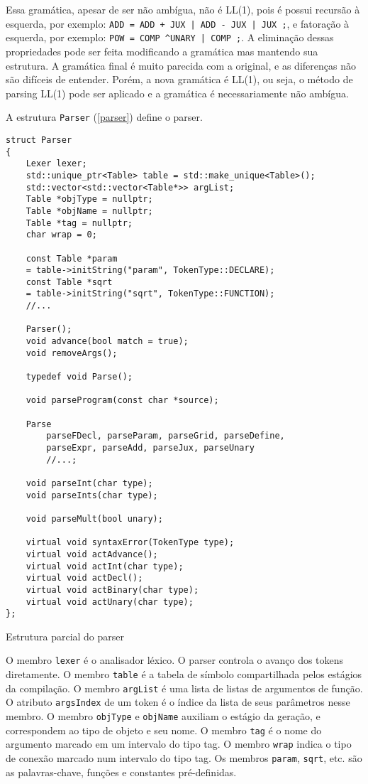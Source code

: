 \documentclass[10pt,a4paper]{article}
\newenvironment{code}{\captionsetup{type=listing}}{}
\begin{document}
Essa gramática, apesar de ser não ambígua, não é LL(1), pois é possui recursão à esquerda,
por exemplo: \texttt{ADD = ADD + JUX | ADD - JUX | JUX ;}, e fatoração à esquerda,
por exemplo: \texttt{POW = COMP \textasciicircum UNARY | COMP ;}.
A eliminação dessas propriedades pode ser feita modificando a gramática mas mantendo sua estrutura.
A gramática final é muito parecida com a original, e as diferenças não são difíceis de entender.
Porém, a nova gramática é LL(1), ou seja, o método de parsing LL(1) pode ser aplicado e
a gramática é necessariamente não ambígua.

A estrutura \texttt{Parser} (\ref{parser}) define o parser.

\begin{code}
\begin{verbatim}
struct Parser
{
    Lexer lexer;
    std::unique_ptr<Table> table = std::make_unique<Table>();
    std::vector<std::vector<Table*>> argList;
    Table *objType = nullptr;
    Table *objName = nullptr;
    Table *tag = nullptr;
    char wrap = 0;
	
    const Table *param
    = table->initString("param", TokenType::DECLARE);
    const Table *sqrt
    = table->initString("sqrt", TokenType::FUNCTION);
    //...

    Parser();
    void advance(bool match = true);
    void removeArgs();

    typedef void Parse();

    void parseProgram(const char *source);

    Parse 
        parseFDecl, parseParam, parseGrid, parseDefine, 
        parseExpr, parseAdd, parseJux, parseUnary
        //...;

    void parseInt(char type);
    void parseInts(char type);

    void parseMult(bool unary);

    virtual void syntaxError(TokenType type);
    virtual void actAdvance();
    virtual void actInt(char type);
    virtual void actDecl();
    virtual void actBinary(char type);
    virtual void actUnary(char type);
};
\end{verbatim}
\caption{Estrutura parcial do parser}
\label{parser}
\end{code}

O membro \texttt{lexer} é o analisador léxico. O parser controla o avanço dos tokens diretamente.
O membro \texttt{table} é a tabela de símbolo compartilhada pelos estágios da compilação.
O membro \texttt{argList} é uma lista de listas de argumentos de função.
O atributo \texttt{argsIndex} de um token é o índice da lista de seus parâmetros nesse membro.
O membro \texttt{objType} e \texttt{objName} auxiliam o estágio da geração, e correspondem ao tipo de objeto e seu nome.
O membro \texttt{tag} é o nome do argumento marcado em um intervalo do tipo tag.
O membro \texttt{wrap} indica o tipo de conexão marcado num intervalo do tipo tag.
Os membros \texttt{param}, \texttt{sqrt}, etc. são as palavras-chave, funções e constantes pré-definidas.
\end{document}
